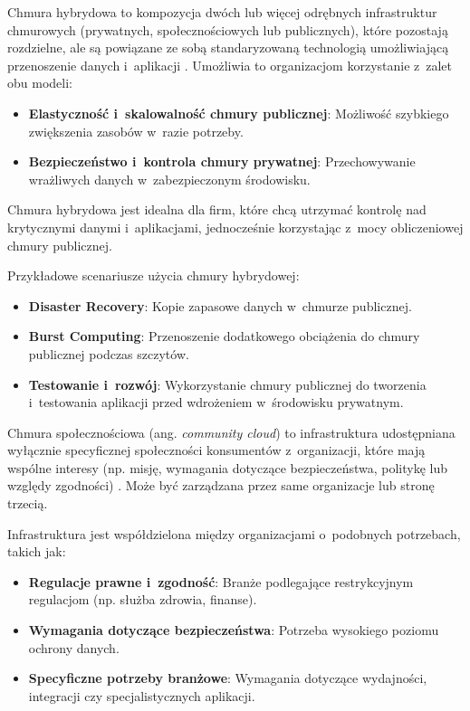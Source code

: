\begin{description}[style=nextline, font=\bfseries]
    \item[Chmura hybrydowa]
          Chmura hybrydowa to kompozycja dwóch lub więcej odrębnych infrastruktur chmurowych (prywatnych, społecznościowych lub publicznych), które pozostają rozdzielne, ale są powiązane ze sobą standaryzowaną technologią umożliwiającą przenoszenie danych i~aplikacji \cite{Mell2011NISTCloudDefinition}.
          Umożliwia to organizacjom korzystanie z~zalet obu modeli:

          \begin{itemize}[leftmargin=*]
              \item \textbf{Elastyczność i~skalowalność chmury publicznej}: Możliwość szybkiego zwiększenia zasobów w~razie potrzeby.
              \item \textbf{Bezpieczeństwo i~kontrola chmury prywatnej}: Przechowywanie wrażliwych danych w~zabezpieczonym środowisku.
          \end{itemize}

          Chmura hybrydowa jest idealna dla firm, które chcą utrzymać kontrolę nad krytycznymi danymi i~aplikacjami, jednocześnie korzystając z~mocy obliczeniowej chmury publicznej.

          Przykładowe scenariusze użycia chmury hybrydowej:
          \begin{itemize}[leftmargin=*]
              \item \textbf{Disaster Recovery}: Kopie zapasowe danych w~chmurze publicznej.
              \item \textbf{Burst Computing}: Przenoszenie dodatkowego obciążenia do chmury publicznej podczas szczytów.
              \item \textbf{Testowanie i~rozwój}: Wykorzystanie chmury publicznej do tworzenia i~testowania aplikacji przed wdrożeniem w~środowisku prywatnym.
          \end{itemize}

    \item[Chmura społecznościowa]
          Chmura społecznościowa (ang. \textit{community cloud}) to infrastruktura udostępniana wyłącznie specyficznej społeczności konsumentów z~organizacji, które mają wspólne interesy (np. misję, wymagania dotyczące bezpieczeństwa, politykę lub względy zgodności) \cite{Mell2011NISTCloudDefinition}.
          Może być zarządzana przez same organizacje lub stronę trzecią.

          Infrastruktura jest współdzielona między organizacjami o~podobnych potrzebach, takich jak:
          \begin{itemize}[leftmargin=*]
              \item \textbf{Regulacje prawne i~zgodność}: Branże podlegające restrykcyjnym regulacjom (np. służba zdrowia, finanse).
              \item \textbf{Wymagania dotyczące bezpieczeństwa}: Potrzeba wysokiego poziomu ochrony danych.
              \item \textbf{Specyficzne potrzeby branżowe}: Wymagania dotyczące wydajności, integracji czy specjalistycznych aplikacji.
          \end{itemize}


\end{description}
